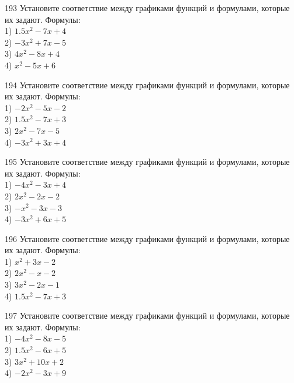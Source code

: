 \documentclass[4apaper]{article}
\begin{document}
\begin{taskBN}{193}
Установите соответствие между графиками функций и формулами, которые их задают. Формулы: \\1) $1.5x^2-7x+4$\\2) $-3x^2+7x-5$\\3) $4x^2-8x+4$\\4) $x^2-5x+6$
\end{taskBN}

\begin{taskBN}{194}
Установите соответствие между графиками функций и формулами, которые их задают. Формулы: \\1) $-2x^2-5x-2$\\2) $1.5x^2-7x+3$\\3) $2x^2-7x-5$\\4) $-3x^2+3x+4$
\end{taskBN}

\begin{taskBN}{195}
Установите соответствие между графиками функций и формулами, которые их задают. Формулы: \\1) $-4x^2-3x+4$\\2) $2x^2-2x-2$\\3) $-x^2-3x-3$\\4) $-3x^2+6x+5$
\end{taskBN}

\begin{taskBN}{196}
Установите соответствие между графиками функций и формулами, которые их задают. Формулы: \\1) $x^2+3x-2$\\2) $2x^2-x-2$\\3) $3x^2-2x-1$\\4) $1.5x^2-7x+3$
\end{taskBN}

\begin{taskBN}{197}
Установите соответствие между графиками функций и формулами, которые их задают. Формулы: \\1) $-4x^2-8x-5$\\2) $1.5x^2-6x+5$\\3) $3x^2+10x+2$\\4) $-2x^2-3x+9$
\end{taskBN}
\end{document}
